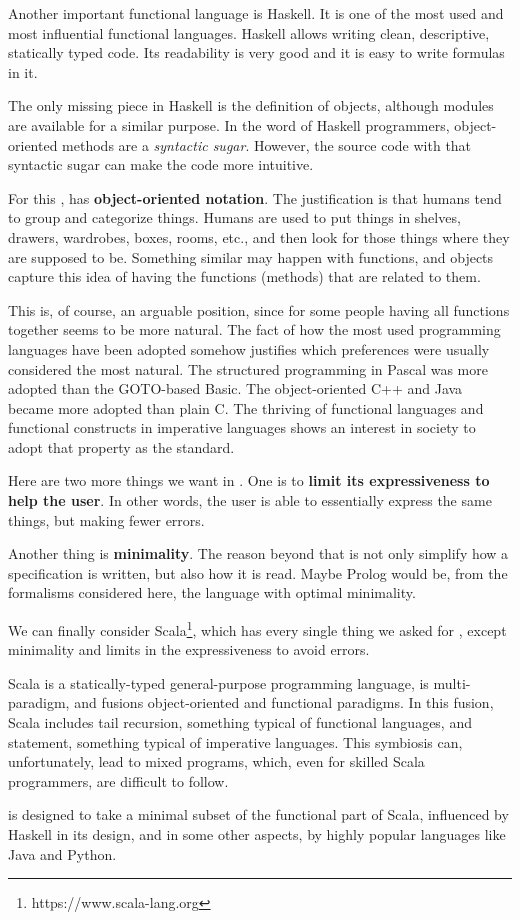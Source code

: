 Another important functional language is Haskell.
It is one of the most used and most influential functional languages.
Haskell allows writing clean, descriptive, statically typed code.
Its readability is very good and it is easy to write formulas in it.

The only missing piece in Haskell is the definition of objects, although modules are available for a similar purpose.
In the word of Haskell programmers, object-oriented methods are a \textit{syntactic sugar}.
However, the source code with that syntactic sugar can make the code more intuitive.

For this \Soda, has \textbf{object-oriented notation}.
The justification is that humans tend to group and categorize things. %
Humans are used to put things in shelves, drawers, wardrobes, boxes, rooms, etc., and then look for those things where they are supposed to be.
Something similar may happen with functions, and objects capture this idea of having the functions (methods) that are related to them.

This is, of course, an arguable position, since for some people having all functions together seems to be more natural.
The fact of how the most used programming languages have been adopted somehow justifies which preferences were usually considered the most natural.
The structured programming in Pascal was more adopted than the GOTO-based Basic.
The object-oriented C++ and Java became more adopted than plain C.
The thriving of functional languages and functional constructs in imperative languages shows an interest in society to adopt that property as the standard.

Here are two more things we want in \Soda.
One is to \textbf{limit its expressiveness to help the user}.
In other words, the user is able to essentially express the same things, but making fewer errors.

Another thing is \textbf{minimality}.
The reason beyond that is not only simplify how a specification is written, but also how it is read.
Maybe Prolog would be, from the formalisms considered here, the language with optimal minimality.

We can finally consider Scala\footnote{https://www.scala-lang.org}, which has every single thing we asked for \Soda, except minimality and limits in the expressiveness to avoid errors.

Scala is a statically-typed general-purpose programming language, is multi-paradigm, and fusions object-oriented and functional paradigms.
In this fusion, Scala includes tail recursion, something typical of functional languages, and \scalawhile statement, something typical of imperative languages.
This symbiosis can, unfortunately, lead to mixed programs, which, even for skilled Scala programmers, are difficult to follow.

\Soda is designed to take a minimal subset of the functional part of Scala, influenced by Haskell in its design, and in some other aspects, by highly popular languages like Java and Python.


